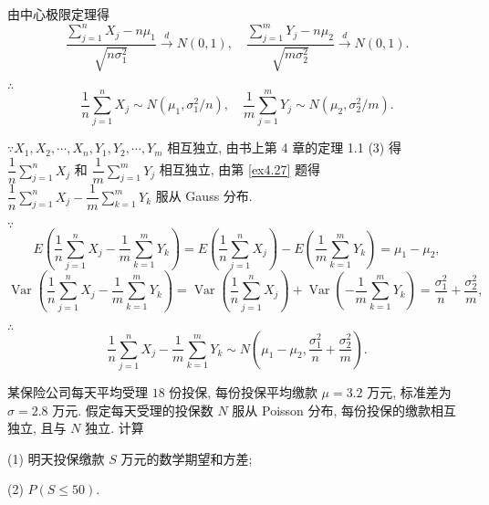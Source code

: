 \documentclass{ctexart}
\begin{document}
\begin{solution}
    由中心极限定理得
    \[\dfrac{\sum\limits_{j=1}^nX_j-n\mu_1}{\sqrt{n\sigma_1^2}}\xrightarrow{d}N(0,1),\quad\dfrac{\sum\limits_{j=1}^mY_j-n\mu_2}{\sqrt{m\sigma_2^2}}\xrightarrow{d}N(0,1).\]

    $\therefore$
    \[\dfrac{1}{n}\sum\limits_{j=1}^nX_j\sim N(\mu_1,\sigma^2_1/n),\quad\dfrac{1}{m}\sum\limits_{j=1}^mY_j\sim N(\mu_2,\sigma_2^2/m).\]

    $\because X_1,X_2,\cdots,X_n,Y_1,Y_2,\cdots,Y_m$ 相互独立, 由书上第 4 章的定理 1.1 (3) 得 $\dfrac{1}{n}\sum\limits_{j=1}^nX_j$ 和 $\dfrac{1}{m}\sum\limits_{j=1}^mY_j$ 相互独立, 由第 \ref{ex4.27} 题得 $\dfrac{1}{n}\sum\limits_{j=1}^nX_j-\dfrac{1}{m}\sum\limits_{k=1}^mY_k$ 服从 Gauss 分布.

    $\because$
    \[E\left(\dfrac{1}{n}\sum\limits_{j=1}^nX_j-\dfrac{1}{m}\sum\limits_{k=1}^mY_k\right)=E\left(\dfrac{1}{n}\sum\limits_{j=1}^nX_j\right)-E\left(\dfrac{1}{m}\sum\limits_{k=1}^mY_k\right)=\mu_1-\mu_2,\]
    \[\operatorname{Var}\left(\dfrac{1}{n}\sum\limits_{j=1}^nX_j-\dfrac{1}{m}\sum\limits_{k=1}^mY_k\right)=\operatorname{Var}\left(\dfrac{1}{n}\sum\limits_{j=1}^nX_j\right)+\operatorname{Var}\left(-\dfrac{1}{m}\sum\limits_{k=1}^mY_k\right)=\dfrac{\sigma_1^2}{n}+\dfrac{\sigma_2^2}{m},\]

    $\therefore$
    \[\dfrac{1}{n}\sum\limits_{j=1}^nX_j-\dfrac{1}{m}\sum\limits_{k=1}^mY_k\sim N\left(\mu_1-\mu_2,\dfrac{\sigma_1^2}{n}+\dfrac{\sigma_2^2}{m}\right).\]
\end{solution}
\begin{exercise}%
    某保险公司每天平均受理 $18$ 份投保, 每份投保平均缴款 $\mu=3.2$ 万元, 标准差为 $\sigma=2.8$ 万元. 假定每天受理的投保数 $N$ 服从 Poisson 分布, 每份投保的缴款相互独立, 且与 $N$ 独立. 计算

    (1) 明天投保缴款 $S$ 万元的数学期望和方差;

    (2) $P(S\leq50)$.
\end{exercise}
\end{document}
